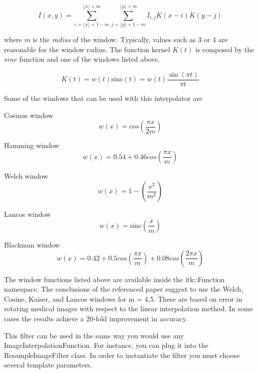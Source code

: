 \begin{equation}
I(x,y) = 
\sum_{i = \lfloor x \rfloor + 1 - m}^{\lfloor x \rfloor + m} 
\sum_{j = \lfloor y \rfloor + 1 - m}^{\lfloor y \rfloor + m}
I_{i,j} K(x-i) K(y-j)
\end{equation}

where $m$ is the \emph{radius} of the window. Typically, values such as 3 or 4
are reasonable for the window radius. The function kernel $K(t)$ is composed by
the $sinc$ function and one of the windows listed above.

\begin{equation}
K(t) = w(t) \textrm{sinc}(t) = w(t) \frac{\sin(\pi t)}{\pi t}
\end{equation}

Some of the windows that can be used with this interpolator are

Cosinus window
\begin{equation}
w(x) = cos ( \frac{\pi x}{2 m} ) 
\end{equation}


Hamming window
\begin{equation}
w(x) = 0.54 + 0.46 cos ( \frac{\pi x}{m} ) 
\end{equation}


Welch window
\begin{equation}
w(x) = 1 - ( \frac{x^2}{m^2} )
\end{equation}


Lancos window
\begin{equation}
w(x) = \textrm{sinc} ( \frac{x}{m} ) 
\end{equation}


Blackman window
\begin{equation}
w(x) = 0.42 + 0.5 cos(\frac{\pi x}{m}) + 0.08 cos(\frac{2 \pi x}{m}) 
\end{equation}


The window functions listed above are available inside the itk::Function
namespace. The conclusions of the referenced paper suggest to use the Welch,
Cosine, Kaiser, and Lancos windows for m = 4,5. These are based on error in
rotating medical images with respect to the linear interpolation method. In
some cases the results achieve a 20-fold improvement in accuracy.

This filter can be used in the same way you would use any
ImageInterpolationFunction. For instance, you can plug it into the
ResampleImageFilter class.  In order to instantiate the filter you must choose
several template parameters. 

